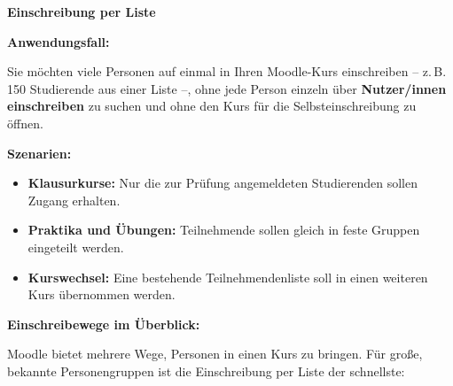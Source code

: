\documentclass{article}
\newlength{\commonwidth}
\begin{document}
\begin{center}
\textbf{\textcolor{customred}{\LARGE Einschreibung per Liste \faListUl{}}}
\end{center}

\vspace{0.5cm}

\begin{center}
\begin{minipage}{\commonwidth}
\begin{mdframed}[backgroundcolor=lightgray, linewidth=0pt, roundcorner=5pt]
\textbf{Anwendungsfall:}

Sie möchten viele Personen auf einmal in Ihren Moodle-Kurs einschreiben -- z.\,B. 150 Studierende aus einer Liste --, ohne jede Person einzeln über \textbf{Nutzer/innen einschreiben} zu suchen und ohne den Kurs für die Selbsteinschreibung zu öffnen.

\vspace{0.3cm}

\textbf{Szenarien:}
\begin{itemize}
  \item \textbf{Klausurkurse:} Nur die zur Prüfung angemeldeten Studierenden sollen Zugang erhalten.
  \item \textbf{Praktika und Übungen:} Teilnehmende sollen gleich in feste Gruppen eingeteilt werden.
  \item \textbf{Kurswechsel:} Eine bestehende Teilnehmendenliste soll in einen weiteren Kurs übernommen werden.
\end{itemize}
\end{mdframed}
\end{minipage}
\end{center}

\vspace{0.8cm}

\textbf{Einschreibewege im Überblick:}

Moodle bietet mehrere Wege, Personen in einen Kurs zu bringen. Für große, bekannte Personengruppen ist die Einschreibung per Liste der schnellste:

\vspace{0.4cm}

\renewcommand{\arraystretch}{1.4}
\setlength{\tabcolsep}{6pt}
\end{document}
